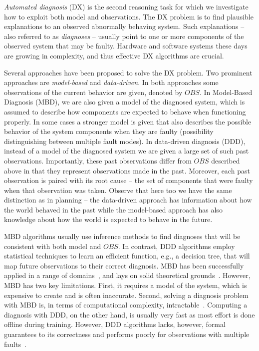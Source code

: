 \documentclass[12pt]{article}
\begin{document}
{\em Automated diagnosis} (DX) is the second reasoning task for which we investigate how to exploit both model and observations. The DX problem is to find plausible explanations to an observed abnormally behaving system. Such explanations -- also referred to as {\em diagnoses} -- usually point to one or more components of the observed system that may be faulty. 
Hardware and software systems these days are growing in complexity, and thus effective DX algorithms are crucial. 


Several approaches have been proposed to solve the DX problem. Two prominent approaches are {\em model-based} and {\em data-driven}. In both approaches some observations of the current behavior are given, denoted by $OBS$. In Model-Based Diagnosis (MBD), we are also given a model of the diagnosed system, which is assumed to describe how  components are expected to behave when functioning properly. In some cases a stronger model is given that also describes the possible behavior of the system components when they are faulty (possibility distinguishing between multiple fault modes). In data-driven diagnosis (DDD), instead of a model of the diagnosed system we are given a large set of such past observations. Importantly, these past observations differ from $OBS$ described above in that they represent observations made in the past. Moreover, each past observation is paired with its root cause -- the set of components that were faulty when that observation was taken. Observe that here too we have the same distinction as in planning -- the data-driven approach has information about how the world behaved in the past while the model-based approach has also knowledge about how the world is expected to behave in the future. 


MBD algorithms usually use inference methods to find diagnoses that will be consistent with both model and $OBS$. In contrast, DDD algorithms employ statistical techniques to learn an efficient function, e.g., a decision tree, that will map future observations to their correct diagnosis. 
MBD has been successfully applied in a range of domains~\cite{williams96,struss2003model,wotawa2002model}, and lays on solid theoretical grounds~\cite{de1987diagnosing,reiter1987theory}. However, MBD has two key limitations. First, it requires a model of the system, which is expensive to create and is often inaccurate. Second, solving a diagnosis problem with MBD is, in terms of computational complexity, intractable~\cite{bylander1991computational}. Computing a diagnosis with DDD, on the other hand, is usually very fast as most effort is done offline during training. However, DDD algorithms lacks, however, formal guarantees to its correctness and performs poorly for observations with multiple faults~\cite{keren2011model}. 
\end{document}
